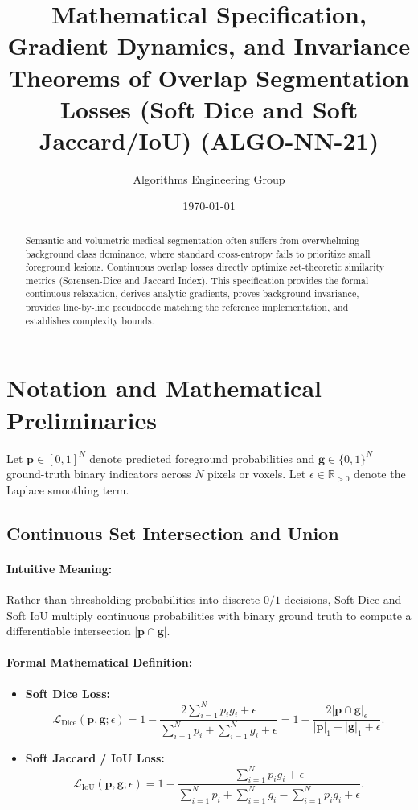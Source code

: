 \documentclass[11pt]{article}
\title{\textbf{Mathematical Specification, Gradient Dynamics, and Invariance Theorems of Overlap Segmentation Losses (Soft Dice and Soft Jaccard/IoU) (ALGO-NN-21)}}
\author{Algorithms Engineering Group}
\date{\today}
\begin{document}
\maketitle

\begin{abstract}
Semantic and volumetric medical segmentation often suffers from overwhelming background class dominance, where standard cross-entropy fails to prioritize small foreground lesions. Continuous overlap losses directly optimize set-theoretic similarity metrics (S{\o}rensen-Dice and Jaccard Index). This specification provides the formal continuous relaxation, derives analytic gradients, proves background invariance, provides line-by-line pseudocode matching the reference implementation, and establishes complexity bounds.
\end{abstract}

\section{Notation and Mathematical Preliminaries}
\label{sec:notation}

Let $\mathbf{p} \in [0, 1]^N$ denote predicted foreground probabilities and $\mathbf{g} \in \{0, 1\}^N$ ground-truth binary indicators across $N$ pixels or voxels. Let $\epsilon \in \mathbb{R}_{>0}$ denote the Laplace smoothing term.

\subsection{Continuous Set Intersection and Union}
\paragraph{Intuitive Meaning:} Rather than thresholding probabilities into discrete $0/1$ decisions, Soft Dice and Soft IoU multiply continuous probabilities with binary ground truth to compute a differentiable intersection $|\mathbf{p} \cap \mathbf{g}|$.

\paragraph{Formal Mathematical Definition:}
\begin{itemize}
    \item \textbf{Soft Dice Loss:}
    \begin{equation}
    \label{eq:soft_dice}
    \mathcal{L}_{\mathrm{Dice}}(\mathbf{p}, \mathbf{g}; \epsilon) = 1 - \frac{2 \sum_{i=1}^N p_i g_i + \epsilon}{\sum_{i=1}^N p_i + \sum_{i=1}^N g_i + \epsilon} = 1 - \frac{2 |\mathbf{p} \cap \mathbf{g}|_\epsilon}{|\mathbf{p}|_1 + |\mathbf{g}|_1 + \epsilon}.
    \end{equation}
    \item \textbf{Soft Jaccard / IoU Loss:}
    \begin{equation}
    \label{eq:soft_iou}
    \mathcal{L}_{\mathrm{IoU}}(\mathbf{p}, \mathbf{g}; \epsilon) = 1 - \frac{\sum_{i=1}^N p_i g_i + \epsilon}{\sum_{i=1}^N p_i + \sum_{i=1}^N g_i - \sum_{i=1}^N p_i g_i + \epsilon}.
    \end{equation}
\end{itemize}
\end{document}
